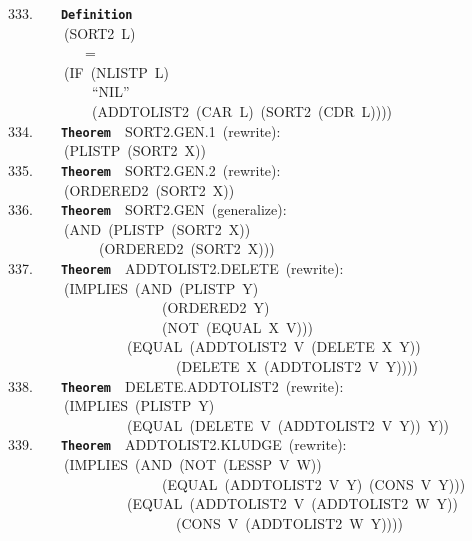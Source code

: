 \documentclass[11pt]{book}
\newenvironment{pubasis}{\begin{flushleft}\ttfamily\small}{\normalsize\rmfamily\end{flushleft}}
\newcommand{\axiomordefinition}[1]{\vspace{6pt}\texttt{\textbf{#1}}}
\begin{document}
\begin{pubasis}
333.~~~~\axiomordefinition{Definition}\\
~~~~~~~~(SORT2~L)\\
~~~~~~~~~~~=\\
~~~~~~~~(IF~(NLISTP~L)\\
~~~~~~~~~~~~``NIL''\\
~~~~~~~~~~~~(ADDTOLIST2~(CAR~L)~(SORT2~(CDR~L))))\\

334.~~~~\axiomordefinition{Theorem}~~SORT2.GEN.1~(rewrite):\\
~~~~~~~~(PLISTP~(SORT2~X))\\

335.~~~~\axiomordefinition{Theorem}~~SORT2.GEN.2~(rewrite):\\
~~~~~~~~(ORDERED2~(SORT2~X))\\

336.~~~~\axiomordefinition{Theorem}~~SORT2.GEN~(generalize):\\
~~~~~~~~(AND~(PLISTP~(SORT2~X))\\
~~~~~~~~~~~~~(ORDERED2~(SORT2~X)))\\

337.~~~~\axiomordefinition{Theorem}~~ADD\-TO\-LIST2.DELETE~(rewrite):\\
~~~~~~~~(IMPLIES~(AND~(PLISTP~Y)\\
~~~~~~~~~~~~~~~~~~~~~~(ORDERED2~Y)\\
~~~~~~~~~~~~~~~~~~~~~~(NOT~(EQUAL~X~V)))\\
~~~~~~~~~~~~~~~~~(EQUAL~(ADDTOLIST2~V~(DELETE~X~Y))\\
~~~~~~~~~~~~~~~~~~~~~~~~(DELETE~X~(ADDTOLIST2~V~Y))))\\

338.~~~~\axiomordefinition{Theorem}~~DELETE.ADD\-TO\-LIST2~(rewrite):\\
~~~~~~~~(IMPLIES~(PLISTP~Y)\\
~~~~~~~~~~~~~~~~~(EQUAL~(DELETE~V~(ADDTOLIST2~V~Y))~Y))\\

339.~~~~\axiomordefinition{Theorem}~~ADD\-TO\-LIST2.KLUDGE~(rewrite):\\
~~~~~~~~(IMPLIES~(AND~(NOT~(LESSP~V~W))\\
~~~~~~~~~~~~~~~~~~~~~~(EQUAL~(ADDTOLIST2~V~Y)~(CONS~V~Y)))\\
~~~~~~~~~~~~~~~~~(EQUAL~(ADDTOLIST2~V~(ADDTOLIST2~W~Y))\\
~~~~~~~~~~~~~~~~~~~~~~~~(CONS~V~(ADDTOLIST2~W~Y))))\\


\end{pubasis}
\end{document}
